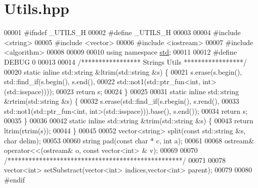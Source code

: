 \hypertarget{_utils_8hpp_source}{}\section{Utils.\+hpp}
\label{_utils_8hpp_source}

\begin{DoxyCode}
00001 \textcolor{preprocessor}{#ifndef \_UTILS\_H}
00002 \textcolor{preprocessor}{#define \_UTILS\_H}
00003 
00004 \textcolor{preprocessor}{#include <string>}
00005 \textcolor{preprocessor}{#include <vector>}
00006 \textcolor{preprocessor}{#include <iostream>}
00007 \textcolor{preprocessor}{#include <algorithm>}
00008 
00009 
00010 \textcolor{keyword}{using namespace }\hyperlink{namespacestd}{std};
00011 
00012 \textcolor{preprocessor}{#define DEBUG 0}
00013 
00014 \textcolor{comment}{/***************** Strings Utils *****************/}
00020 \textcolor{keyword}{static} \textcolor{keyword}{inline} std::string &ltrim(std::string &s) \{
00021     s.erase(s.begin(), std::find\_if(s.begin(), s.end(),
00022             std::not1(std::ptr\_fun<int, int>(std::isspace))));
00023     \textcolor{keywordflow}{return} s;
00024 \}
00025 
00031 \textcolor{keyword}{static} \textcolor{keyword}{inline} std::string &rtrim(std::string &s) \{
00032     s.erase(std::find\_if(s.rbegin(), s.rend(),
00033             std::not1(std::ptr\_fun<int, int>(std::isspace))).base(), s.end());
00034     \textcolor{keywordflow}{return} s;
00035 \}
00036 
00042 \textcolor{keyword}{static} \textcolor{keyword}{inline} std::string &trim(std::string &s) \{
00043     \textcolor{keywordflow}{return} ltrim(rtrim(s));
00044 \}
00045 
00052 vector<string> split(\textcolor{keyword}{const} std::string &s, \textcolor{keywordtype}{char} delim);
00053 
00060 \textcolor{keywordtype}{string} pad(\textcolor{keyword}{const} \textcolor{keywordtype}{char} * c, \textcolor{keywordtype}{int} a);
00061 
00068 ostream& operator<<(ostream& o, const vector<int> & v);
00069 
00070 \textcolor{comment}{/**************************************************/}
00071 
00078 vector<int> setSubstract(vector<int> indices,vector<int> parent);
00079 
00080 \textcolor{preprocessor}{#endif }
\end{DoxyCode}
